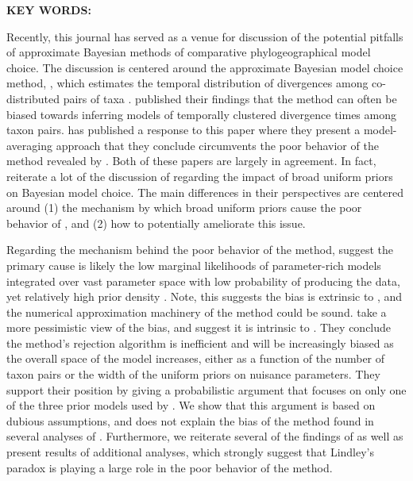 \documentclass[letterpaper,12pt]{article}
\begin{document}
\begin{linenumbers}
{    \vspace{12pt}
    \noindent\textbf{KEY WORDS: } 
}

\newpage
\noindent Recently, this journal has served as a venue for discussion of the
potential pitfalls of approximate Bayesian methods of comparative
phylogeographical model choice.
The discussion is centered around the approximate Bayesian model choice method,
\msb, which estimates the temporal distribution of divergences among
co-distributed pairs of taxa \citep{Huang2011}.
\citet{Oaks2012} published their findings that the method \msb can often be
biased towards inferring models of temporally clustered divergence times among
taxon pairs.
\citet{Hickerson2013} has published a response to this paper where they
present a model-averaging approach that they conclude circumvents the poor
behavior of the method revealed by \citet{Oaks2012}.
Both of these papers are largely in agreement.
In fact, \citet{Hickerson2013} reiterate a lot of the discussion of
\citet{Oaks2012} regarding the impact of broad uniform priors on Bayesian model
choice.
The main differences in their perspectives are centered around
(1) the mechanism by which broad uniform priors cause the poor behavior of
\msb, and
(2) how to potentially ameliorate this issue.

Regarding the mechanism behind the poor behavior of the method,
\citet{Oaks2012} suggest the primary cause is likely the low marginal
likelihoods of parameter-rich models integrated over vast parameter space with
low probability of producing the data, yet relatively high prior density
\citep[this is often referred to as Lindley's paradox;][]{Lindley1957}.
Note, this suggests the bias is extrinsic to \msb, and the numerical
approximation machinery of the method could be sound.
\citet{Hickerson2013} take a more pessimistic view of the bias, and suggest it
is intrinsic to \msb.
They conclude the method's rejection algorithm is inefficient and will be
increasingly biased as the overall space of the model increases, either as a
function of the number of taxon pairs or the width of the uniform priors on
nuisance parameters.
They support their position by giving a probabilistic argument that focuses on
only one of the three prior models used by \citet{Oaks2012}.
We show that this argument is based on dubious assumptions, and does not
explain the bias of the method found in several analyses of \citet{Oaks2012}.
Furthermore, we reiterate several of the findings of \citet{Oaks2012} as well
as present results of additional analyses, which strongly suggest that
Lindley's paradox is playing a large role in the poor behavior of the method.


\end{linenumbers}
\end{document}
